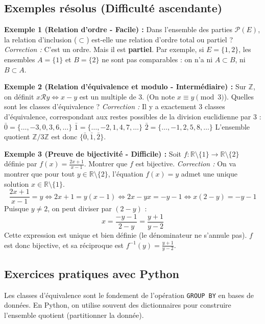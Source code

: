 \documentclass[12pt,a4paper]{report}
\begin{document}
\subsection{Exemples résolus (Difficulté ascendante)}

\textbf{Exemple 1 (Relation d'ordre - Facile) :} 
Dans l'ensemble des parties $\mathcal{P}(E)$, la relation d'inclusion ($\subset$) est-elle une relation d'ordre total ou partiel ?
\textit{Correction :} C'est un ordre. Mais il est \textbf{partiel}. Par exemple, si $E = \{1, 2\}$, les ensembles $A = \{1\}$ et $B = \{2\}$ ne sont pas comparables : on n'a ni $A \subset B$, ni $B \subset A$.

\textbf{Exemple 2 (Relation d'équivalence et modulo - Intermédiaire) :}
Sur $\mathbb{Z}$, on définit $x \mathcal{R} y \iff x - y$ est un multiple de 3. (On note $x \equiv y \pmod 3$).
Quelles sont les classes d'équivalence ?
\textit{Correction :} Il y a exactement 3 classes d'équivalence, correspondant aux restes possibles de la division euclidienne par 3 :
$\bar{0} = \{\dots, -3, 0, 3, 6, \dots\}$
$\bar{1} = \{\dots, -2, 1, 4, 7, \dots\}$
$\bar{2} = \{\dots, -1, 2, 5, 8, \dots\}$
L'ensemble quotient $\mathbb{Z}/3\mathbb{Z}$ est donc $\{\bar{0}, \bar{1}, \bar{2}\}$.

\textbf{Exemple 3 (Preuve de bijectivité - Difficile) :}
Soit $f : \mathbb{R} \setminus \{1\} \to \mathbb{R} \setminus \{2\}$ définie par $f(x) = \frac{2x+1}{x-1}$. Montrer que $f$ est bijective.
\textit{Correction :} On va montrer que pour tout $y \in \mathbb{R} \setminus \{2\}$, l'équation $f(x) = y$ admet une unique solution $x \in \mathbb{R} \setminus \{1\}$.
$$ \frac{2x+1}{x-1} = y \iff 2x+1 = y(x-1) \iff 2x - yx = -y - 1 \iff x(2-y) = -y-1 $$
Puisque $y \neq 2$, on peut diviser par $(2-y)$ :
$$ x = \frac{-y-1}{2-y} = \frac{y+1}{y-2} $$
Cette expression est unique et bien définie (le dénominateur ne s'annule pas). $f$ est donc bijective, et sa réciproque est $f^{-1}(y) = \frac{y+1}{y-2}$.

\subsection{Exercices pratiques avec Python}
Les classes d'équivalence sont le fondement de l'opération \texttt{GROUP BY} en bases de données. En Python, on utilise souvent des dictionnaires pour construire l'ensemble quotient (partitionner la donnée).
\end{document}
